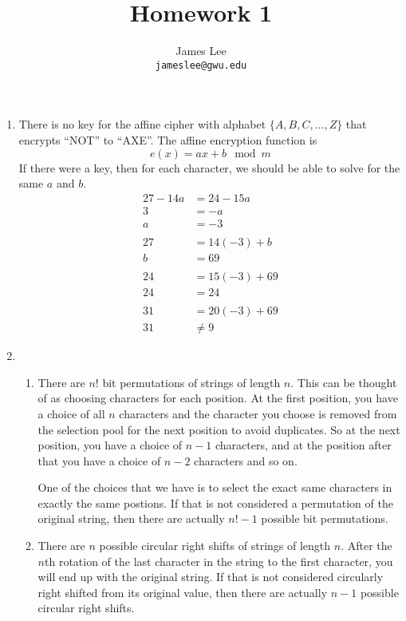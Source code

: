 \documentclass{amsart}
\title{Homework 1}
\author{James Lee\\
\texttt{jameslee@gwu.edu}}
\begin{document}
\maketitle

\begin{enumerate}
\item There is no key for the affine cipher with alphabet $\{A, B, C,\ldots, Z\}$ that encrypts ``NOT'' to ``AXE''.  The affine encryption function is
\begin{displaymath}
e(x)=ax+b\mod m
\end{displaymath}
If there were a key, then for each character, we should be able to solve for the same $a$ and $b$.
\begin{align*}
27-14a&=24-15a\\
3&=-a\\
a&=-3\\
\\
27&=14(-3)+b\\
b&=69\\
\\
24&=15(-3)+69\\
24&=24\\
\\
31&=20(-3)+69\\
31&\neq 9
\end{align*}

\item
\begin{enumerate}
\item There are $n!$ bit permutations of strings of length $n$.  This can be thought of as choosing characters for each position.  At the first position, you have a choice of all $n$ characters and the character you choose is removed from the selection pool for the next position to avoid duplicates.  So at the next position, you have a choice of $n-1$ characters, and at the position after that you have a choice of $n-2$ characters and so on.

One of the choices that we have is to select the exact same characters in exactly the same postions.  If that is not considered a permutation of the original string, then there are actually $n!-1$ possible bit permutations.

\item There are $n$ possible circular right shifts of strings of length $n$.  After the $n$th rotation of the last character in the string to the first character, you will end up with the original string.  If that is not considered circularly right shifted from its original value, then there are actually $n-1$ possible circular right shifts.


\end{enumerate}
\end{enumerate}
\end{document}
